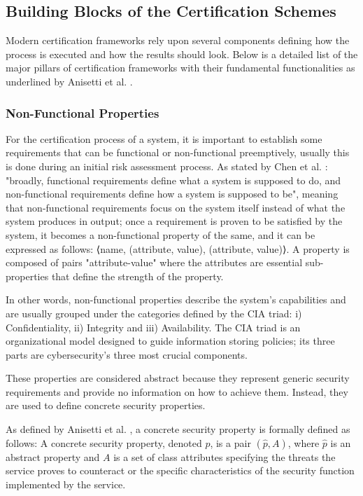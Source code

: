 

\subsection{Building Blocks of the Certification Schemes}
Modern certification frameworks rely upon several components defining how the process is executed and how the results should look. Below is a detailed list of the major pillars of certification frameworks with their fundamental functionalities as underlined by Anisetti et al. \cite{anisetti2017semi}\cite{anisetti2022multi}.

\subsubsection{Non-Functional Properties}
For the certification process of a system, it is important to establish some requirements that can be functional or non-functional preemptively, usually this is done during an initial risk assessment process. As stated by Chen et al. \cite{chen2013verification}: "broadly, functional requirements define what a system is supposed to do, and non-functional requirements define how a system is supposed to be", meaning that non-functional requirements focus on the system itself instead of what the system produces in output; once a requirement is proven to be satisfied by the system, it becomes a non-functional property of the same, and it can be expressed as follows: ⟨name, {(attribute, value), (attribute, value)}⟩. A property is composed of pairs "attribute-value" where the attributes are essential sub-properties that define the strength of the property.

In other words, non-functional properties describe the system's capabilities and are usually grouped under the categories defined by the CIA triad: i) Confidentiality, ii) Integrity and iii) Availability. The CIA triad is an organizational model designed to guide information storing policies; its three parts are cybersecurity's three most crucial components.

These properties are considered abstract because they represent generic security requirements and provide no information on how to achieve them. Instead, they are used to define concrete security properties. 

As defined by Anisetti et al. \cite{anisetti2013test}, a concrete security property is formally defined as follows:
A concrete security property, denoted \(p\), is a pair \( ( \hat{p}, A) \), where \(\hat{p}\) is an abstract property and \(A\) is a set of class attributes specifying the threats the service proves to counteract or the specific characteristics of the security function implemented by the service.

